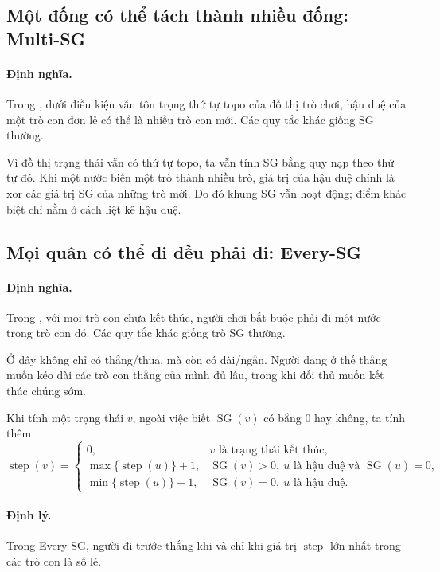 \documentclass[11pt]{article}
\newcommand{\SG}{\operatorname{SG}}
\newcommand{\step}{\operatorname{step}}
\begin{document}
\subsection{Một đống có thể tách thành nhiều đống: Multi-SG}

\paragraph{Định nghĩa.}
Trong , dưới điều kiện vẫn tôn trọng thứ tự topo của đồ thị
trò chơi, hậu duệ của một trò con đơn lẻ có thể là nhiều trò con mới. Các quy
tắc khác giống SG thường.

Vì đồ thị trạng thái vẫn có thứ tự topo, ta vẫn tính SG bằng quy nạp theo thứ
tự đó. Khi một nước biến một trò thành nhiều trò, giá trị của hậu duệ chính
là xor các giá trị SG của những trò mới. Do đó khung SG vẫn hoạt động; điểm
khác biệt chỉ nằm ở cách liệt kê hậu duệ.

\subsection{Mọi quân có thể đi đều phải đi: Every-SG}

\paragraph{Định nghĩa.}
Trong , với mọi trò con chưa kết thúc, người chơi bắt buộc phải
đi một nước trong trò con đó. Các quy tắc khác giống trò SG thường.

Ở đây không chỉ có thắng/thua, mà còn có dài/ngắn. Người đang ở thế thắng muốn
kéo dài các trò con thắng của mình đủ lâu, trong khi đối thủ muốn kết thúc
chúng sớm.

Khi tính một trạng thái \(v\), ngoài việc biết \(\SG(v)\) có bằng \(0\) hay
không, ta tính thêm
\[
\step(v)=
\begin{cases}
0, & v \text{ là trạng thái kết thúc},\\
\max\{\step(u)\}+1, & \SG(v)>0,\ u \text{ là hậu duệ và } \SG(u)=0,\\
\min\{\step(u)\}+1, & \SG(v)=0,\ u \text{ là hậu duệ}.
\end{cases}
\]

\paragraph{Định lý.}
Trong Every-SG, người đi trước thắng khi và chỉ khi giá trị \(\step\) lớn
nhất trong các trò con là số lẻ.
\end{document}

